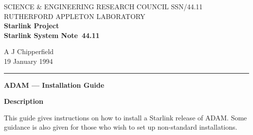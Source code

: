 \pagestyle{myheadings}

\newcommand{\stardoccategory}  {Starlink System Note}
\newcommand{\stardocinitials}  {SSN}
\newcommand{\stardocnumber}    {44.11}
\newcommand{\stardocauthors}   {A J Chipperfield}
\newcommand{\stardocdate}      {19 January 1994}
\newcommand{\stardoctitle}     {ADAM --- Installation Guide}

\newcommand{\stardocname}{\stardocinitials /\stardocnumber}
\renewcommand{\_}{{\tt\char'137}}     %
\markright{\stardocname}
\setlength{\textwidth}{160mm}
\setlength{\textheight}{230mm}
\setlength{\topmargin}{-2mm}
\setlength{\oddsidemargin}{0mm}
\setlength{\evensidemargin}{0mm}
\setlength{\parindent}{0mm}
\setlength{\parskip}{\medskipamount}
\setlength{\unitlength}{1mm}



\thispagestyle{empty}
SCIENCE \& ENGINEERING RESEARCH COUNCIL \hfill \stardocname\\
RUTHERFORD APPLETON LABORATORY\\
{\large\bf Starlink Project\\}
{\large\bf \stardoccategory\ \stardocnumber}
\begin{flushright}
\stardocauthors\\
\stardocdate
\end{flushright}
\vspace{-4mm}
\rule{\textwidth}{0.5mm}
\vspace{5mm}
\begin{center}
{\Huge\bf \stardoctitle}
\end{center}
\vspace{20mm}

\begin{center}
{\Large\bf Description}
\end{center}


This guide gives instructions on how to install a Starlink release of ADAM.
Some guidance is also given for those who wish to set up non-standard
installations.

